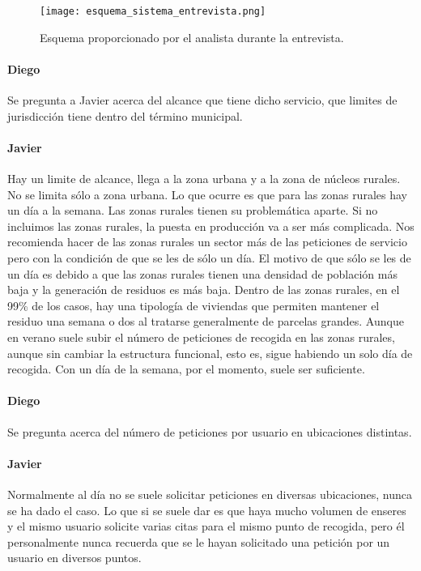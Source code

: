 \begin{figure}[H]
\centering
    \texttt{[image: esquema\_sistema\_entrevista.png]}
\caption{Esquema proporcionado por el analista durante la entrevista.}
\end{figure}
 
\paragraph{Diego} Se pregunta a Javier acerca del alcance que tiene dicho servicio, que limites de jurisdicción tiene dentro del término municipal.
 
\paragraph{Javier} Hay un limite de alcance, llega a la zona urbana y a la zona de núcleos rurales. No se limita sólo a zona urbana. Lo que ocurre es que para las zonas rurales hay un día a la semana. Las zonas rurales tienen su problemática aparte. Si no incluimos las zonas rurales, la puesta en producción va a ser más complicada. Nos recomienda hacer de las zonas rurales un sector más de las peticiones de servicio pero con la condición de que se les de sólo un día.  El motivo de que sólo se les de un día es debido a que las zonas rurales tienen una densidad de población más baja y la generación de residuos es más baja. Dentro de las zonas rurales, en el 99\% de los casos, hay una tipología de viviendas que permiten mantener el residuo una semana o dos al tratarse generalmente de parcelas grandes. Aunque en verano suele subir el número de peticiones de recogida en las zonas rurales, aunque sin cambiar la estructura funcional, esto es, sigue habiendo un solo día de recogida. Con un día de la semana, por el momento, suele ser suficiente.
 
\paragraph{Diego} Se pregunta acerca del número de peticiones por usuario en ubicaciones distintas.
 
\paragraph{Javier} Normalmente al día no se suele solicitar peticiones en diversas ubicaciones, nunca se ha dado el caso. Lo que si se suele dar es que haya mucho volumen de enseres y el mismo usuario solicite varias citas para el mismo punto de recogida, pero él personalmente nunca recuerda que se le hayan solicitado una petición por un usuario en diversos puntos.
 
